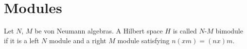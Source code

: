 \section{Modules}

\begin{definition}
  Let $N$, $M$ be von Neumann algebras.
  A Hilbert space $H$ is called $N$-$M$ bimodule if it is a left $N$ module and a right $M$ module satisfying $n(xm) = (nx)m$.
\end{definition}

